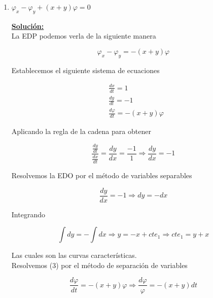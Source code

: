 \documentclass{article}
\begin{document}
		\begin{enumerate}
			\item $\varphi _x -\varphi _y +(x+y)\varphi =0$
				
				{\bf\underline{Solución:}}\\
					
					La EDP podemos verla de la siguiente manera
						
						\begin{equation*}
							\varphi _x- \varphi _y = -(x+y)\varphi 
						\end{equation*}
					
					Establecemos el siguiente sistema de ecuaciones
						
						\begin{align}
							&\frac{dx}{dt} =1\\
							&\frac{dy}{dt} =-1\\
							&\frac{d\varphi}{dt} = -(x+y)\varphi
						\end{align}						
					
					Aplicando la regla de la cadena para obtener
						
						\begin{equation*}
							\frac{\frac{dy}{dt}}{\frac{dx}{dt}} = \frac{dy}{dx} = \frac{-1}{1} \Longrightarrow \frac{dy}{dx} =-1
						\end{equation*}											
					
					Resolvemos la EDO por el método de variables separables
						
						\begin{equation*}
							\frac{dy}{dx} =-1 \Longrightarrow dy=-dx
						\end{equation*}
					
					Integrando 
						
						\begin{equation}
							\int dy =-\int dx \Longrightarrow y=-x+cte_1 \Longrightarrow cte_1 =y+x
						\end{equation}
					
					Las cuales son las curvas características.\\
					
					Resolvemos (3) por el  método de separación de variables
						
						\begin{equation*}
							\frac{d\varphi}{dt} = -(x+y)\varphi \Longrightarrow \frac{d\varphi}{\varphi} =-(x+y)dt 
						\end{equation*}
					

\end{enumerate}
\end{document}
